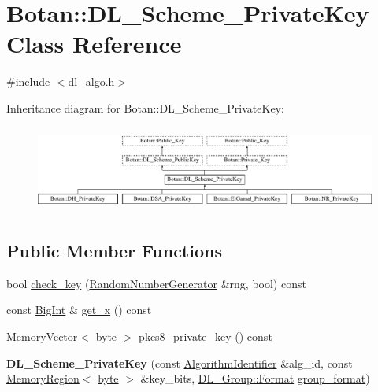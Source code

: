 \hypertarget{classBotan_1_1DL__Scheme__PrivateKey}{\section{Botan\-:\-:D\-L\-\_\-\-Scheme\-\_\-\-Private\-Key Class Reference}
\label{classBotan_1_1DL__Scheme__PrivateKey}
}


{\ttfamily \#include $<$dl\-\_\-algo.\-h$>$}

Inheritance diagram for Botan\-:\-:D\-L\-\_\-\-Scheme\-\_\-\-Private\-Key\-:\begin{figure}[H]
\begin{center}
\leavevmode
\includegraphics[height=2.871795cm]{classBotan_1_1DL__Scheme__PrivateKey}
\end{center}
\end{figure}
\subsection*{Public Member Functions}
\begin{DoxyCompactItemize}
\item 
bool \hyperlink{classBotan_1_1DL__Scheme__PrivateKey_a4d0939286ac8135cb025c7316d771b7b}{check\-\_\-key} (\hyperlink{classBotan_1_1RandomNumberGenerator}{Random\-Number\-Generator} \&rng, bool) const 
\item 
const \hyperlink{classBotan_1_1BigInt}{Big\-Int} \& \hyperlink{classBotan_1_1DL__Scheme__PrivateKey_a97fc8a47eaec78c65d5fc02a9d98960a}{get\-\_\-x} () const 
\item 
\hyperlink{classBotan_1_1MemoryVector}{Memory\-Vector}$<$ \hyperlink{namespaceBotan_a7d793989d801281df48c6b19616b8b84}{byte} $>$ \hyperlink{classBotan_1_1DL__Scheme__PrivateKey_aebc1e9c10721bf4e86b368c631161707}{pkcs8\-\_\-private\-\_\-key} () const 
\item 
\hypertarget{classBotan_1_1DL__Scheme__PrivateKey_a900c71ab9421ff98404371af77481697}{{\bfseries D\-L\-\_\-\-Scheme\-\_\-\-Private\-Key} (const \hyperlink{classBotan_1_1AlgorithmIdentifier}{Algorithm\-Identifier} \&alg\-\_\-id, const \hyperlink{classBotan_1_1MemoryRegion}{Memory\-Region}$<$ \hyperlink{namespaceBotan_a7d793989d801281df48c6b19616b8b84}{byte} $>$ \&key\-\_\-bits, \hyperlink{classBotan_1_1DL__Group_ac602a30420ceec03fa181a10b09312a7}{D\-L\-\_\-\-Group\-::\-Format} \hyperlink{classBotan_1_1DL__Scheme__PublicKey_adf0844f45b1a8ed790ad2b15f1ea4040}{group\-\_\-format})}\label{classBotan_1_1DL__Scheme__PrivateKey_a900c71ab9421ff98404371af77481697}

\end{DoxyCompactItemize}
